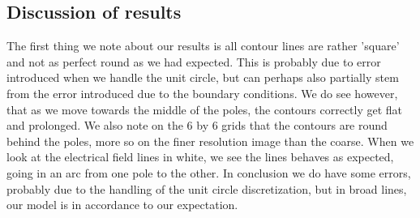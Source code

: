 \subsection{Discussion of results}
The first thing we note about our results is all contour lines are rather 'square' and not as perfect round as we had expected. This is probably due to error introduced when we handle the unit circle, but can perhaps also partially stem from the error introduced due to the boundary conditions. We do see however, that as we move towards the middle of the poles, the contours correctly get flat and prolonged. We also note on the 6 by 6 grids that the contours are round behind the poles, more so on the finer resolution image than the coarse. When we look at the electrical field lines in white, we see the lines behaves as expected, going in an arc from one pole to the other. In conclusion we do have some errors, probably due to the handling of the unit circle discretization, but in broad lines, our model is in accordance to our expectation.